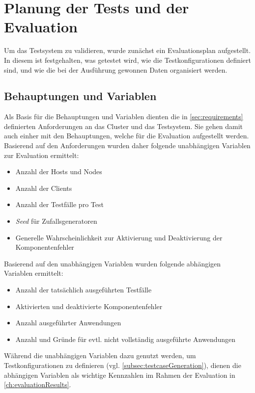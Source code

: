 \section{Planung der Tests und der Evaluation}
\label{sec:evaluationPlan}

Um das Testsystem zu validieren, wurde zunächst ein Evaluationsplan aufgestellt.
In diesem ist festgehalten, was getestet wird, wie die Testkonfigurationen definiert sind, und wie die bei der Ausführung gewonnen Daten organisiert werden.

\subsection{Behauptungen und Variablen}
\label{subsec:theses}

Als Basis für die Behauptungen und Variablen dienten die in \cref{sec:requirements} definierten Anforderungen an das Cluster und das Testsystem.
Sie gehen damit auch einher mit den Behauptungen, welche für die Evaluation aufgestellt werden.
Basierend auf den Anforderungen wurden daher folgende unabhängigen Variablen zur Evaluation ermittelt:

\begin{itemize}
    \item Anzahl der Hosts und Nodes
    \item Anzahl der Clients
    \item Anzahl der Testfälle pro Test
    \item \emph{Seed} für Zufallsgeneratoren
    \item Generelle Wahrscheinlichkeit zur Aktivierung und Deaktivierung der Komponentenfehler
\end{itemize}

Basierend auf den unabhängigen Variablen wurden \uA folgende abhängigen Variablen ermittelt:

\begin{itemize}
    \item Anzahl der tatsächlich ausgeführten Testfälle
    \item Aktivierten und deaktivierte Komponentenfehler
    \item Anzahl ausgeführter Anwendungen
    \item Anzahl und Gründe für evtl. nicht vollständig ausgeführte Anwendungen
\end{itemize}

Während die unabhängigen Variablen dazu genutzt werden, um Testkonfigurationen zu definieren (vgl. \cref{subsec:testcaseGeneration}), dienen die abhängigen Variablen als wichtige Kennzahlen im Rahmen der Evaluation in \cref{ch:evaluationResults}.


